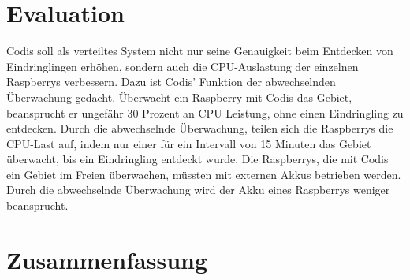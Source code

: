 \documentclass[journal]{IEEEtran}
\begin{document}
\section{Evaluation}

Codis soll als verteiltes System nicht nur seine Genauigkeit beim Entdecken von Eindringlingen erhöhen, sondern auch die CPU-Auslastung der einzelnen Raspberrys verbessern. Dazu ist Codis' Funktion der abwechselnden Überwachung gedacht. Überwacht ein Raspberry mit Codis das Gebiet, beansprucht er ungefähr 30 Prozent an CPU Leistung, ohne einen Eindringling zu entdecken. Durch die abwechselnde Überwachung, teilen sich die Raspberrys die CPU-Last auf, indem nur einer für ein Intervall von 15 Minuten das Gebiet überwacht, bis ein Eindringling entdeckt wurde. Die Raspberrys, die mit Codis ein Gebiet im Freien überwachen, müssten mit externen Akkus betrieben werden. Durch die abwechselnde Überwachung wird der Akku eines Raspberrys weniger beansprucht.

\section{Zusammenfassung}




\printbibliography
\end{document}
